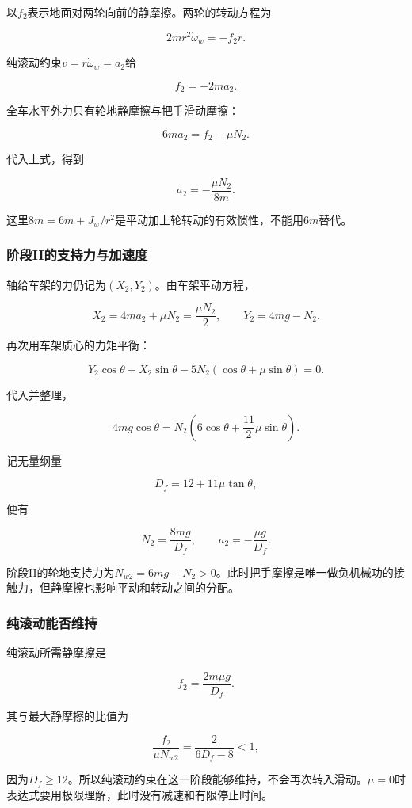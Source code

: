 \documentclass[12pt,a4paper,fontset=fandol]{ctexart}
\begin{document}
以\(f_2\)表示地面对两轮向前的静摩擦。两轮的转动方程为

\[
2mr^2\dot\omega_w=-f_2r.
\]

纯滚动约束\(\dot v=r\dot\omega_w=a_2\)给

\[
\boxed{f_2=-2ma_2}.
\]

全车水平外力只有轮地静摩擦与把手滑动摩擦：

\[
6ma_2=f_2-\mu N_2.
\]

代入上式，得到

\[
\boxed{a_2=-\frac{\mu N_2}{8m}}.
\]

这里\(8m=6m+J_w/r^2\)是平动加上轮转动的有效惯性，不能用\(6m\)替代。

\subsubsection{阶段II的支持力与加速度}\label{ux9636ux6bb5iiux7684ux652fux6301ux529bux4e0eux52a0ux901fux5ea6}

轴给车架的力仍记为\((X_2,Y_2)\)。由车架平动方程，

\[
X_2=4ma_2+\mu N_2=\frac{\mu N_2}{2},
\qquad
Y_2=4mg-N_2.
\]

再次用车架质心的力矩平衡：

\[
Y_2\cos\theta-X_2\sin\theta
-5N_2(\cos\theta+\mu\sin\theta)=0.
\]

代入并整理，

\[
4mg\cos\theta
=N_2\left(6\cos\theta+\frac{11}{2}\mu\sin\theta\right).
\]

记无量纲量

\[
D_f=12+11\mu\tan\theta,
\]

便有

\[
\boxed{N_2=\frac{8mg}{D_f}},
\qquad
\boxed{a_2=-\frac{\mu g}{D_f}}.
\]

阶段II的轮地支持力为\(N_{w2}=6mg-N_2>0\)。此时把手摩擦是唯一做负机械功的接触力，但静摩擦也影响平动和转动之间的分配。

\subsubsection{纯滚动能否维持}\label{ux7eafux6edaux52a8ux80fdux5426ux7ef4ux6301}

纯滚动所需静摩擦是

\[
f_2=\frac{2m\mu g}{D_f}.
\]

其与最大静摩擦的比值为

\[
\frac{f_2}{\mu N_{w2}}
=\frac{2}{6D_f-8}<1,
\]

因为\(D_f\ge12\)。所以纯滚动约束在这一阶段能够维持，不会再次转入滑动。\(\mu=0\)时表达式要用极限理解，此时没有减速和有限停止时间。
\end{document}
